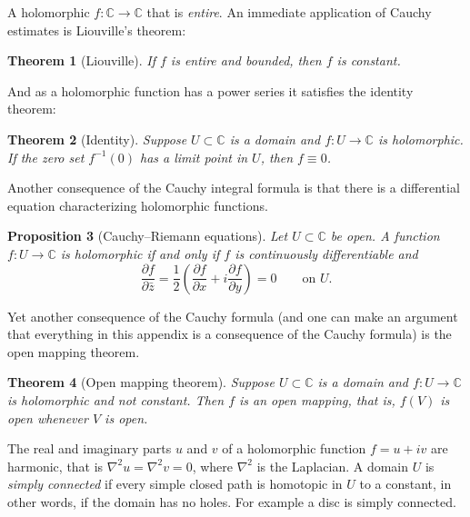 \documentclass[12pt,openany]{book}
\newcommand{\C}{{\mathbb{C}}}
\newcommand{\myindex}[1]{#1\index{#1}}
\theoremstyle{plain}
\newtheorem{thm}{Theorem}[section]
\newtheorem{prop}[thm]{Proposition}
\theoremstyle{remark}
\theoremstyle{definition}
\theoremstyle{exercise}
\theoremstyle{example}
\begin{document}
A holomorphic $f \colon \C \to \C$ that is
\emph{\myindex{entire}}.  An immediate application of Cauchy estimates
is Liouville's theorem:

\begin{thm}[Liouville]
If $f$ is entire and bounded, then $f$ is constant.
\end{thm}

And as a holomorphic function has a power series it satisfies the
identity theorem:

\begin{thm}[Identity] \label{thm:onevaridentity}
Suppose $U \subset \C$ is a domain and $f \colon U \to \C$ is holomorphic.
If the zero set $f^{-1}(0)$ has a limit point in $U$, then
$f \equiv 0$.
\end{thm}

Another consequence  of the Cauchy integral formula is that there is
a differential equation characterizing holomorphic functions.

\begin{prop}[Cauchy--Riemann equations]
Let $U \subset \C$ be open.
A function $f \colon U \to \C$ is holomorphic if and only if
$f$ is continuously differentiable and
\begin{equation*}
\frac{\partial f}{\partial \bar{z}}
=
\frac{1}{2}
\left(
\frac{\partial f}{\partial x} + i
\frac{\partial f}{\partial y}
\right)
 = 0 \qquad \text{on $U$.}
\end{equation*}
\end{prop}

Yet another consequence of the Cauchy formula (and one can make an argument
that everything in this appendix is a consequence of the Cauchy formula)
is the open mapping theorem.

\begin{thm}[Open mapping theorem]
Suppose $U \subset \C$ is a domain and
$f \colon U \to \C$ is holomorphic and not constant.
Then $f$ is an open mapping, that is,
$f(V)$ is open whenever $V$ is open.
\end{thm}

The real and imaginary parts $u$ and $v$ of a holomorphic function $f =
u+iv$ are harmonic, that is
$\nabla^2 u = \nabla^2 v = 0$, where $\nabla^2$ is the
Laplacian.
A domain $U$ is \emph{\myindex{simply connected}} if every simple closed
path
is homotopic in $U$ to a constant, in other words, if the domain has no
holes.  For example a disc is simply connected.
\end{document}
